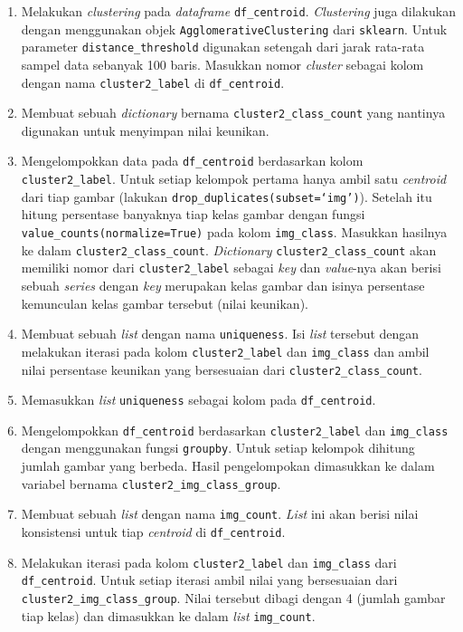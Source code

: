 \begin{enumerate}
	\item Melakukan \textit{clustering} pada \textit{dataframe} \texttt{df\_centroid}. \textit{Clustering} juga dilakukan dengan menggunakan objek \texttt{AgglomerativeClustering} dari \texttt{sklearn}. Untuk parameter \texttt{distance\_threshold} digunakan setengah dari jarak rata-rata sampel data sebanyak 100 baris.
	Masukkan nomor \textit{cluster} sebagai kolom dengan nama \texttt{cluster2\_label} di \texttt{df\_centroid}.
	\item Membuat sebuah \textit{dictionary} bernama \texttt{cluster2\_class\_count} yang nantinya digunakan untuk menyimpan nilai keunikan.
	\item Mengelompokkan data pada \texttt{df\_centroid} berdasarkan kolom \texttt{cluster2\_label}. Untuk setiap kelompok pertama hanya ambil satu \textit{centroid} dari tiap gambar (lakukan \texttt{drop\_duplicates(subset=`img')}). Setelah itu hitung persentase banyaknya tiap kelas gambar dengan fungsi \texttt{value\_counts(normalize=True)} pada kolom \texttt{img\_class}. Masukkan hasilnya ke dalam \texttt{cluster2\_class\_count}. \textit{Dictionary} \texttt{cluster2\_class\_count} akan memiliki nomor dari \texttt{cluster2\_label} sebagai \textit{key} dan \textit{value}-nya akan berisi sebuah \textit{series} dengan \textit{key} merupakan kelas gambar dan isinya persentase kemunculan kelas gambar tersebut (nilai keunikan).
	\item Membuat sebuah \textit{list} dengan nama \texttt{uniqueness}. Isi \textit{list} tersebut dengan melakukan iterasi pada kolom \texttt{cluster2\_label} dan \texttt{img\_class} dan ambil nilai persentase keunikan yang bersesuaian dari \texttt{cluster2\_class\_count}.
	\item Memasukkan \textit{list} \texttt{uniqueness} sebagai kolom pada \texttt{df\_centroid}.
	\item Mengelompokkan \texttt{df\_centroid} berdasarkan \texttt{cluster2\_label} dan \texttt{img\_class} dengan menggunakan fungsi \texttt{groupby}. Untuk setiap kelompok dihitung jumlah gambar yang berbeda. Hasil pengelompokan dimasukkan ke dalam variabel bernama \texttt{cluster2\_img\_class\_group}.
	\item Membuat sebuah \textit{list} dengan nama \texttt{img\_count}. \textit{List} ini akan berisi nilai konsistensi untuk tiap \textit{centroid} di \texttt{df\_centroid}.
	\item Melakukan iterasi pada kolom \texttt{cluster2\_label} dan \texttt{img\_class} dari \texttt{df\_centroid}. Untuk setiap iterasi ambil nilai yang bersesuaian dari \texttt{cluster2\_img\_class\_group}. Nilai tersebut dibagi dengan 4 (jumlah gambar tiap kelas) dan dimasukkan ke dalam \textit{list} \texttt{img\_count}.

\end{enumerate}
